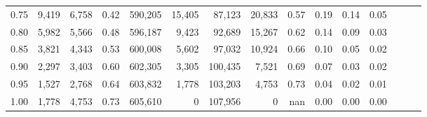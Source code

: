 \begin{tabular}{rrrrrrrrrrrrrrr}
0.75 &   9,419 &   6,758 &  0.42 &  590,205 &   15,405 &   87,123 &   20,833 &  0.57 &  0.19 &  0.14 &      0.05 \\
0.80 &   5,982 &   5,566 &  0.48 &  596,187 &    9,423 &   92,689 &   15,267 &  0.62 &  0.14 &  0.09 &      0.03 \\
0.85 &   3,821 &   4,343 &  0.53 &  600,008 &    5,602 &   97,032 &   10,924 &  0.66 &  0.10 &  0.05 &      0.02 \\
0.90 &   2,297 &   3,403 &  0.60 &  602,305 &    3,305 &  100,435 &    7,521 &  0.69 &  0.07 &  0.03 &      0.02 \\
0.95 &   1,527 &   2,768 &  0.64 &  603,832 &    1,778 &  103,203 &    4,753 &  0.73 &  0.04 &  0.02 &      0.01 \\
1.00 &   1,778 &   4,753 &  0.73 &  605,610 &        0 &  107,956 &        0 &   nan &  0.00 &  0.00 &      0.00 \\
\bottomrule
\end{tabular}
